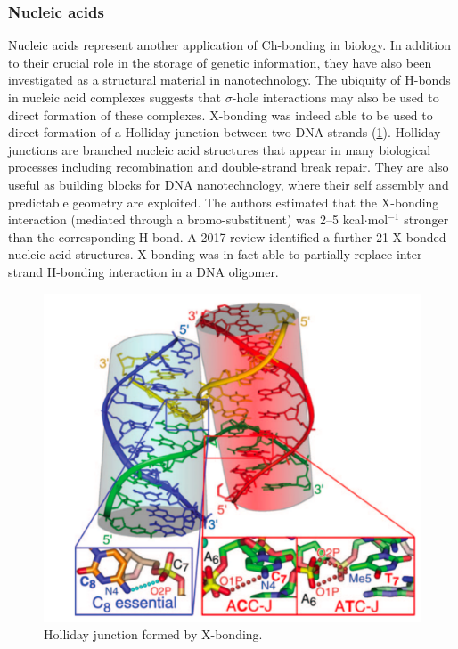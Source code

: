 \begin{refsection}
\subsubsection{Nucleic acids}
Nucleic acids represent another application of Ch-bonding in biology.
In addition to their crucial role in the storage of genetic information, they have also been investigated as a structural material in nanotechnology.
The ubiquity of H-bonds in nucleic acid complexes suggests that $ \sigma $-hole interactions may also be used to direct formation of these complexes.
X-bonding was indeed able to be used to direct formation of a Holliday junction between two DNA strands (\cref{fig:holliday-junction}).\autocite{Voth2007}
Holliday junctions are branched nucleic acid structures that appear in many biological processes including recombination and double-strand break repair.
They are also useful as building blocks for DNA nanotechnology, where their self assembly and predictable geometry are exploited.
The authors estimated that the X-bonding interaction (mediated through a bromo-substituent) was 2--5 kcal$\cdot$mol$^{-1}$ stronger than the corresponding H-bond.
A 2017 review identified a further 21 X-bonded nucleic acid structures.\autocite{Kolar2017}
X-bonding was in fact able to partially replace inter-strand H-bonding interaction in a DNA oligomer.\autocite{Parker2012}

\begin{figure}
    \centering
    \includegraphics[width=0.6\linewidth]{Figures/holliday-junction.pdf}
    \caption[Holliday junction formed by X-bonding.]{Holliday junction formed by X-bonding.\autocite{Voth2007}}\label{fig:holliday-junction}
\end{figure}


\end{refsection}
